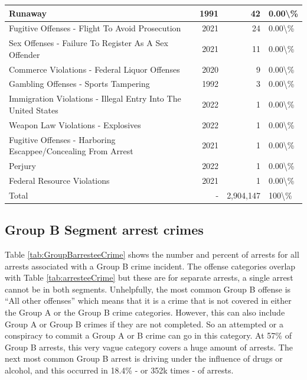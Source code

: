 \documentclass[
]{krantz}
\begin{document}
\begin{longtable}[t]{l|r|r|l}
\hline
Runaway & 1991 & 42 & 0.00\textbackslash{}\%\\
\hline
Fugitive Offenses - Flight To Avoid Prosecution & 2021 & 24 & 0.00\textbackslash{}\%\\
\hline
Sex Offenses - Failure To Register As A Sex Offender & 2021 & 11 & 0.00\textbackslash{}\%\\
\hline
Commerce Violations - Federal Liquor Offenses & 2020 & 9 & 0.00\textbackslash{}\%\\
\hline
Gambling Offenses - Sports Tampering & 1992 & 3 & 0.00\textbackslash{}\%\\
\hline
Immigration Violations - Illegal Entry Into The United States & 2022 & 1 & 0.00\textbackslash{}\%\\
\hline
Weapon Law Violations - Explosives & 2022 & 1 & 0.00\textbackslash{}\%\\
\hline
Fugitive Offenses - Harboring Escappee/Concealing From Arrest & 2021 & 1 & 0.00\textbackslash{}\%\\
\hline
Perjury & 2022 & 1 & 0.00\textbackslash{}\%\\
\hline
Federal Resource Violations & 2021 & 1 & 0.00\textbackslash{}\%\\
\hline
Total & - & 2,904,147 & 100\textbackslash{}\%\\
\hline
\end{longtable}

\subsection{Group B Segment arrest
crimes}\label{group-b-segment-arrest-crimes}

Table \ref{tab:GroupBarresteeCrime} shows the number and
percent of arrests for all arrests associated with a Group B
crime incident. The offense categories overlap with Table
\ref{tab:arresteeCrime} but these are for separate arrests,
a single arrest cannot be in both segments. Unhelpfully, the
most common Group B offense is ``All other offenses'' which
means that it is a crime that is not covered in either the
Group A or the Group B crime categories. However, this can
also include Group A or Group B crimes if they are not
completed. So an attempted or a conspiracy to commit a Group
A or B crime can go in this category. At 57\% of Group B
arrests, this very vague category covers a huge amount of
arrests. The next most common Group B arrest is driving
under the influence of drugs or alcohol, and this occurred
in 18.4\% - or 352k times - of arrests.
\end{document}
